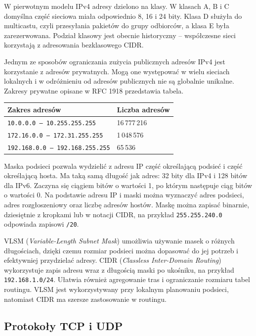\documentclass[11pt,a4paper]{article}
\begin{document}
W pierwotnym modelu IPv4 adresy dzielono na klasy. W klasach A, B i C
domyślna część sieciowa miała odpowiednio 8, 16 i 24 bity. Klasa D służyła
do multicastu, czyli przesyłania pakietów do grupy odbiorców, a klasa E była
zarezerwowana. Podział klasowy jest obecnie historyczny -- współczesne sieci
korzystają z adresowania bezklasowego CIDR.

Jednym ze sposobów ograniczania zużycia publicznych adresów IPv4 jest
korzystanie z adresów prywatnych. Mogą one występować w wielu sieciach
lokalnych i w odróżnieniu od adresów publicznych nie są globalnie unikalne.
Zakresy prywatne opisane w RFC 1918 przedstawia tabela.

\begin{center}
\begin{tabularx}{\textwidth}{@{}lX@{}}
\toprule
Zakres adresów & Liczba adresów \\
\midrule
\texttt{10.0.0.0 -- 10.255.255.255} & 16\,777\,216 \\
\texttt{172.16.0.0 -- 172.31.255.255} & 1\,048\,576 \\
\texttt{192.168.0.0 -- 192.168.255.255} & 65\,536 \\
\bottomrule
\end{tabularx}
\end{center}

Maska podsieci pozwala wydzielić z adresu IP część określającą podsieć
i część określającą hosta. Ma taką samą długość jak adres: 32 bity dla IPv4
i 128 bitów dla IPv6. Zaczyna się ciągiem bitów o wartości 1, po którym
następuje ciąg bitów o wartości 0. Na podstawie adresu IP i maski można
wyznaczyć adres podsieci, adres rozgłoszeniowy oraz liczbę adresów hostów.
Maskę można zapisać binarnie, dziesiętnie z kropkami lub w notacji CIDR,
na przykład \texttt{255.255.240.0} odpowiada zapisowi \texttt{/20}.

VLSM (\textit{Variable-Length Subnet Mask}) umożliwia używanie masek
o różnych długościach, dzięki czemu rozmiar podsieci można dopasować do
jej potrzeb i efektywniej przydzielać adresy. CIDR
(\textit{Classless Inter-Domain Routing}) wykorzystuje zapis adresu wraz
z długością maski po ukośniku, na przykład \texttt{192.168.1.0/24}.
Ułatwia również agregowanie tras i ograniczanie rozmiaru tabel routingu.
VLSM jest wykorzystywany przy lokalnym planowaniu podsieci, natomiast CIDR
ma szersze zastosowanie w routingu.

\subsection*{Protokoły TCP i UDP}
\end{document}
